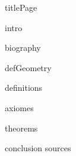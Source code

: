 \documentclass[a4paper,12pt]{article}
\begin{document}
{titlePage}



\tableofcontents

{intro}

{biography}

{defGeometry}

{definitions}

{axiomes}

{theorems}

{conclusion}
{sources}

\pagebreak



\label{Lastpage}
\end{document}
